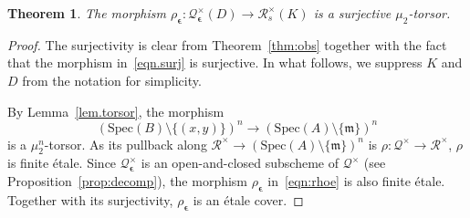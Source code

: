 \documentclass[12pt,reqno]{amsart}
\newcommand{\calQ}{\mathcal{Q}}
\newcommand{\calR}{\mathcal{R}}
\newcommand{\Spec}{\mathrm{Spec}}
\newtheorem{theorem}{Theorem}[section]
\theoremstyle{definition}
\begin{document}
	\begin{theorem} \label{prop.mu2torsor}
		The morphism $	\rho_{\boldsymbol{\epsilon}}:\calQ_{\boldsymbol{\epsilon}}^\times(D) \rightarrow
		\calR_s^\times(K)$ is a surjective $\mu_2$-torsor.
	\end{theorem}
	\begin{proof}
		The surjectivity is clear from Theorem~\ref{thm:obs} together with the fact that the morphism in~\eqref{eqn.surj} is surjective. In what follows, we suppress $K$ and $D$ from the notation for simplicity. 

        By Lemma~\ref{lem.torsor}, the morphism
		\[
		      (\Spec(B)\setminus\{(x,y)\})^n \longrightarrow (\Spec(A)\setminus\{\mathfrak m\})^n
		\]
		is a $\mu_2^n$-torsor. As its pullback along $\calR^\times \rightarrow (\Spec(A)\setminus\{\mathfrak m\})^n$ is $\rho:\calQ^\times \rightarrow \calR^\times$, $\rho$ is finite étale. Since
		$\calQ_{\boldsymbol{\epsilon}}^\times$ is an open-and-closed subscheme of $\calQ^\times$ (see Proposition~\ref{prop:decomp}), the morphism $\rho_{\boldsymbol{\epsilon}}$ in~\eqref{eqn:rhoe}
		is also finite étale. Together with its surjectivity, $\rho_{\boldsymbol{\epsilon}}$ is an \'{e}tale cover.
		

\end{proof}
\end{document}
